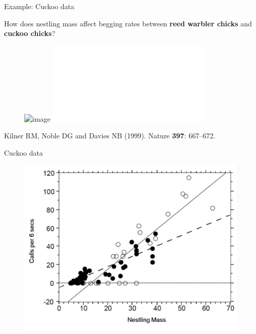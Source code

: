 \documentclass[pdf,handout]{beamer}
\begin{document}
\begin{frame}{Example: Cuckoo data}

How does nestling mass affect begging rates between \textbf{reed warbler chicks} and \textbf{cuckoo chicks}?

\begin{figure}
\includegraphics<1>[width=.65\textwidth]{cuckoo.png}
\includegraphics<2>[width=.65\textwidth]{cuckoo_raw.pdf}
\end{figure}

Kilner RM, Noble DG and Davies NB (1999). Nature \textbf{397}: 667–672.

\end{frame}

\begin{frame}{Cuckoo data}

\begin{figure}
\includegraphics[width=.75\textwidth]{cuckooanalysis.png}
\end{figure}

\end{frame}
\end{document}
